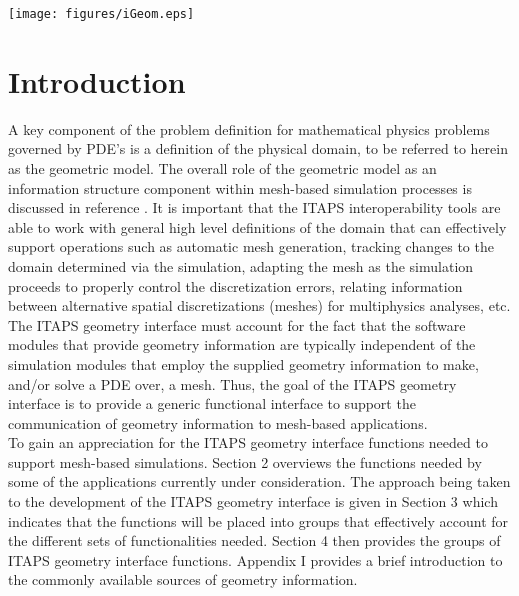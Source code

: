 \documentclass{article}
\begin{document}
\hspace{-1in}
\texttt{[image: figures/iGeom.eps]}

\newpage
\tableofcontents
\newpage
\section{Introduction}
A key component of the problem definition for mathematical 
physics problems governed by PDE's is a definition of the physical 
domain, to be referred to herein as the geometric model. The 
overall role of the geometric model as an information structure 
component within mesh-based simulation processes is discussed 
in reference \cite{r22}. It is important that the ITAPS interoperability 
tools are able to work with general high level definitions of 
the domain that can effectively support operations such as automatic 
mesh generation, tracking changes to the domain determined via 
the simulation, adapting the mesh as the simulation proceeds 
to properly control the discretization errors, relating information 
between alternative spatial discretizations (meshes) for multiphysics 
analyses, etc. \\

The ITAPS geometry interface must account for the fact that 
the software modules that provide geometry information are typically 
independent of the simulation modules that employ the supplied 
geometry information to make, and/or solve a PDE over, a mesh. 
Thus, the goal of the ITAPS geometry interface is to provide a 
generic functional interface to support the communication of 
geometry information to mesh-based applications. \\

To gain an appreciation for the ITAPS geometry interface functions 
needed to support mesh-based simulations.  Section 2 overviews 
the functions needed by some of the applications currently under 
consideration. The approach being taken to the development of 
the ITAPS geometry interface is given in  Section 3 which 
indicates that the functions will be placed into groups that 
effectively account for the different sets of functionalities 
needed.  Section 4 then provides the groups of ITAPS geometry 
interface functions. Appendix I provides a brief introduction 
to the commonly available sources of geometry information.
\end{document}
